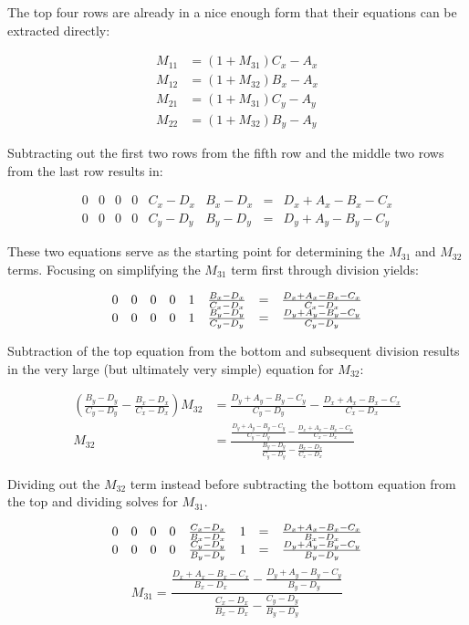\documentclass[letterpaper, 11pt]{article}
\begin{document}
The top four rows are already in a nice enough form that their equations
can be extracted directly:

\begin{align}
M_{11} &= (1 + M_{31})C_x - A_x \\
M_{12} &= (1 + M_{32})B_x - A_x \\
M_{21} &= (1 + M_{31})C_y - A_y \\
M_{22} &= (1 + M_{32})B_y - A_y
\end{align}

Subtracting out the first two rows from the fifth row and the middle two rows from the last 
row results in:

\[
\begin{array}{cccccccc}
0 & 0 & 0 & 0 & C_x - D_x & B_x - D_x & = & D_x + A_x - B_x - C_x \\
0 & 0 & 0 & 0 & C_y - D_y & B_y - D_y & = & D_y + A_y - B_y - C_y
\end{array}
\]

These two equations serve as the starting point for determining
the \(M_{31}\) and \(M_{32}\) terms. Focusing on simplifying the \(M_{31}\) term first
through division yields:

\[
\begin{array}{cccccccc}
0 & 0 & 0 & 0 & 1 & {B_x - D_x}\over{C_x - D_x} & = & {D_x + A_x - B_x - C_x}\over{C_x - D_x} \\
0 & 0 & 0 & 0 & 1 & {B_y - D_y}\over{C_y - D_y} & = & {D_y + A_y - B_y - C_y}\over{C_y - D_y}
\end{array}
\]

Subtraction of the top equation from the bottom and subsequent division results
in the very large (but ultimately very simple) equation for \(M_{32}\):

\begin{align}
\left( { \frac{B_y - D_y}{C_y - D_y} - \frac{B_x - D_x}{C_x - D_x} } \right) M_{32} &= \frac{D_y + A_y - B_y - C_y}{C_y - D_y} - \frac{D_x + A_x - B_x - C_x}{C_x - D_x} \\
M_{32} &= \frac{\frac{D_y + A_y - B_y - C_y}{C_y - D_y} - \frac{D_x + A_x - B_x - C_x}{C_x - D_x}}{\frac{B_y - D_y}{C_y - D_y} - \frac{B_x - D_x}{C_x - D_x}}    
\end{align}

Dividing out the \(M_{32}\) term instead before subtracting the bottom
equation from the top and dividing solves for \(M_{31}\).

\[
\begin{array}{cccccccc}
0 & 0 & 0 & 0 & {C_x - D_x}\over{B_x - D_x} & 1 & = & {D_x + A_x - B_x - C_x}\over{B_x - D_x} \\0 & 0 & 0 & 0 & {C_y - D_y}\over{B_y - D_y} & 1 & = & {D_y + A_y - B_y - C_y}\over{B_y - D_y}
\end{array}
\]$$ M_{31} = \frac{\frac{D_x + A_x - B_x - C_x}{B_x - D_x} - \frac{D_y + A_y - B_y - C_y}{B_y - D_y}}{\frac{C_x - D_x}{B_x - D_x} - \frac{C_y - D_y}{B_y - D_y}} 
 $$
\end{document}
